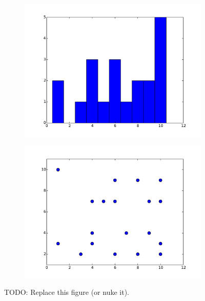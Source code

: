 \begin{problem}
\begin{figure}[H]
\centering
\begin{subfigure}{.5\textwidth}
    \centering
    \includegraphics[width=\linewidth]{histogram.pdf}
    \label{fig:histogram}
\end{subfigure}%
\begin{subfigure}{.5\textwidth}
    \centering
    \includegraphics[width=\linewidth]{scatter.pdf}
    \label{fig:scatter}
\end{subfigure}
\caption{TODO: Replace this figure (or nuke it).}
\end{figure}
\end{problem}

